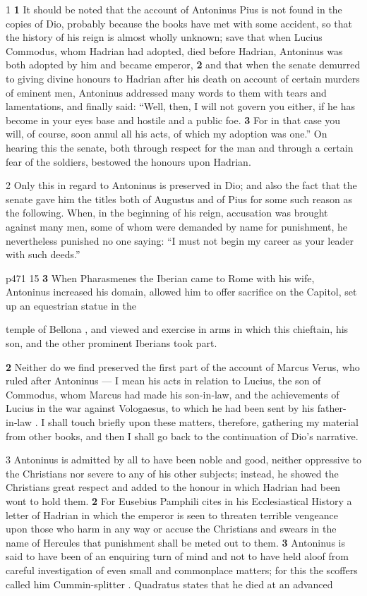 1 \textbf{1} It should be noted that the account of Antoninus Pius is not found in the copies of Dio, probably because the books have met with some accident, so that the history of his reign is almost wholly unknown; save that when Lucius Commodus, whom Hadrian had adopted, died before Hadrian, Antoninus was both adopted by him and became emperor, \textbf{2} and that when the senate demurred to giving divine honours to Hadrian after his death on account of certain murders of eminent men, Antoninus addressed many words to them with tears and lamentations, and finally said: ``Well, then, I will not govern you either, if he has become in your eyes base and hostile and a public foe. \textbf{3} For in that case you will, of course, soon annul all his acts, of which my adoption was one.'' On hearing this the senate, both through respect for the man and through a certain fear of the soldiers, bestowed the honours upon Hadrian.

2 Only this in regard to Antoninus is preserved in Dio; and also the fact that the senate gave him the titles both of Augustus and of Pius for some such reason as the following. When, in the beginning of his reign, accusation was brought against many men, some of whom were demanded by name for punishment, he nevertheless punished no one saying: ``I must not begin my career as your leader with such deeds.''


p471
15
\textbf{3} When Pharasmenes the Iberian came to Rome with his wife, Antoninus increased his domain, allowed him to offer sacrifice on the Capitol, set up an equestrian statue in the

temple of Bellona , and viewed and exercise in arms in which this chieftain, his son, and the other prominent Iberians took part.

\textbf{2} Neither do we find preserved the first part of the account of Marcus Verus, who ruled after Antoninus \texthebrew{—} I mean his acts in relation to Lucius, the son of Commodus, whom Marcus had made his son-in\texthebrew{‑}law, and the achievements of Lucius in the war against Vologaesus, to which he had been sent by his father-in\texthebrew{‑}law . I shall touch briefly upon these matters, therefore, gathering my material from other books, and then I shall go back to the continuation of Dio's narrative.

3 Antoninus is admitted by all to have been noble and good, neither oppressive to the Christians nor severe to any of his other subjects; instead, he showed the Christians great respect and added to the honour in which Hadrian had been wont to hold them. \textbf{2} For Eusebius Pamphili cites in his Ecclesiastical History a letter of Hadrian in which the emperor is seen to threaten terrible vengeance upon those who harm in any way or accuse the Christians and swears in the name of Hercules that punishment shall be meted out to them. \textbf{3} Antoninus is said to have been of an enquiring turn of mind and not to have held aloof from careful investigation of even small and commonplace matters; for this the scoffers called him Cummin-splitter . Quadratus states that he died at an advanced

